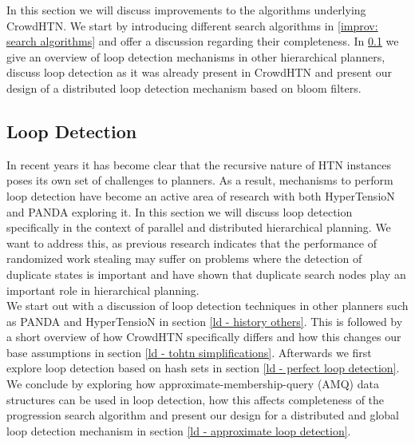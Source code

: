 In this section we will discuss improvements to the algorithms underlying CrowdHTN. We start by introducing different search algorithms in \ref{improv: search algorithms} and offer a discussion regarding their completeness. In \ref{improv: loop detection} we give an overview of loop detection mechanisms in other hierarchical planners, discuss loop detection as it was already present in CrowdHTN and present our design of a distributed loop detection mechanism based on bloom filters.

\subsection{Loop Detection}
\label{improv: loop detection}
In recent years it has become clear that the recursive nature of HTN instances poses its own set of challenges to planners. As a result, mechanisms to perform loop detection have become an active area of research with both HyperTensioN \cite{magnaguagno2020hypertension} and PANDA \cite{holler2021loop} exploring it.
In this section we will discuss loop detection specifically in the context of parallel and distributed hierarchical planning.
We want to address this, as previous research indicates that the performance of randomized work stealing may suffer on problems where the detection of duplicate states is important \cite{fukunaga2018parallel} and \cite{holler2021loop} have shown that duplicate search nodes play an important role in hierarchical planning. \\ 
We start out with a discussion of loop detection techniques in other planners such as PANDA and HyperTensioN in section \ref{ld - history others}. This is followed by a short overview of how CrowdHTN specifically differs and how this changes our base assumptions in section \ref{ld - tohtn simplifications}. Afterwards we first explore loop detection based on hash sets in section \ref{ld - perfect loop detection}. We conclude by exploring how approximate-membership-query (AMQ) data structures can be used in loop detection, how this affects completeness of the progression search algorithm and present our design for a distributed and global loop detection mechanism in section \ref{ld - approximate loop detection}.

